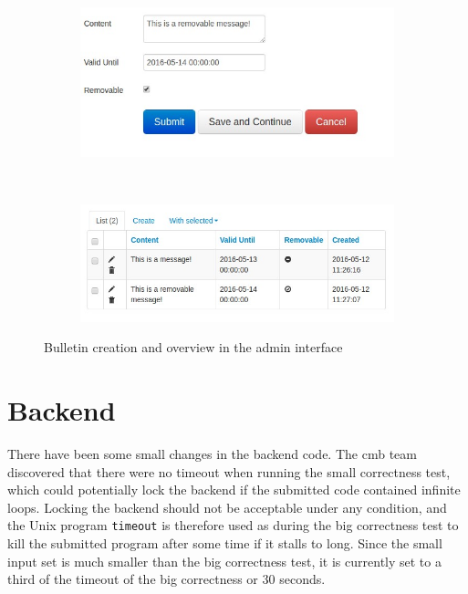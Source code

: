 \begin{figure}
    \centering
    \begin{subfigure}[b]{0.48\textwidth}
        \includegraphics[width=\textwidth]{figs/bulletin_creation.jpg}
    \end{subfigure}
    ~ %
    \begin{subfigure}[b]{0.48\textwidth}
        \includegraphics[width=\textwidth]{figs/bulletin_list.jpg}
    \end{subfigure}
    \caption{Bulletin creation and overview in the admin interface}
    \label{fig:admin-bulletin}
\end{figure}

\section{Backend}
\label{sec:impr-backend}
There have been some small changes in the backend code. The \gls{cmb} team discovered that there were no timeout when running the small correctness test, which could potentially lock the backend if the submitted code contained infinite loops. Locking the backend should not be acceptable under any condition, and the Unix program \texttt{timeout} \cite{TIMEOUT} is therefore used as during the big correctness test to kill the submitted program after some time if it stalls to long. Since the small input set is much smaller than the big correctness test, it is currently set to a third of the timeout of the big correctness or 30 seconds. \\

